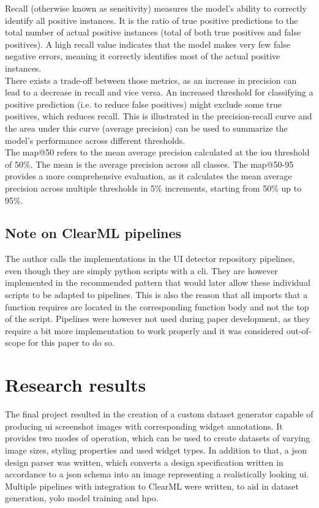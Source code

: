 \documentclass[Bachelor, BIC, english, fhCitStyle, IEEE]{BASE/twbook} %
\begin{document}
Recall (otherwise known as sensitivity) measures the model's ability to correctly identify all positive instances. It is the ratio of true positive predictions to the total number of actual positive instances (total of both true positives and false positives). A high recall value indicates that the model makes very few false negative errors, meaning it correctly identifies most of the actual positive instances.\\
There exists a trade-off between those metrics, as an increase in precision can lead to a decrease in recall and vice versa. An increased threshold for classifying a positive prediction (i.e. to reduce false positives) might exclude some true positives, which reduces recall. This is illustrated in the precision-recall curve and the area under this curve (average precision) can be used to summarize the model's performance across different thresholds.\\
The \ac{map}@50 refers to the mean average precision calculated at the \ac{iou} threshold of 50\%. The mean is the average precision across all classes. The \ac{map}@50-95 provides a more comprehensive evaluation, as it calculates the mean average precision across multiple thresholds in 5\% increments, starting from 50\% up to 95\%.
\section{Note on ClearML pipelines}
The author calls the implementations in the UI detector repository pipelines, even though they are simply python scripts with a \ac{cli}. They are however implemented in the recommended pattern \autocite{PipelineDecoratorClearML} that would later allow these individual scripts to be adapted to pipelines. This is also the reason that all imports that a function requires are located in the corresponding function body and not the top of the script. Pipelines were however not used during paper development, as they require a bit more implementation to work properly and it was considered out-of-scope for this paper to do so.
\clearpage
\chapter{Research results}
The final project resulted in the creation of a custom dataset generator capable of producing \ac{ui} screenshot images with corresponding widget annotations. It provides two modes of operation, which can be used to create datasets of varying image sizes, styling properties and used widget types.
In addition to that, a \ac{json} design parser was written, which converts a design specification written in accordance to a \ac{json} schema into an image representing a realistically looking \ac{ui}. Multiple pipelines with integration to ClearML were written, to aid in dataset generation, \ac{yolo} model training and \acf{hpo}.
\end{document}

